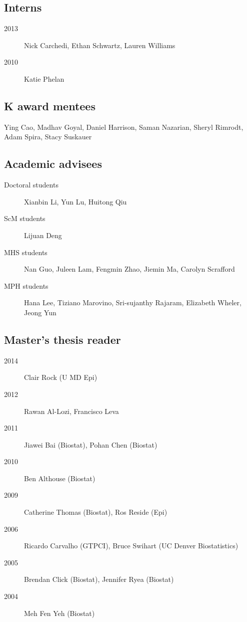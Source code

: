 \documentclass[12pt]{article}
\begin{document}

\subsection*{Interns}
\begin{description}
\item[\textnormal{2013}] Nick Carchedi, Ethan Schwartz, Lauren Williams
\item[\textnormal{2010}] Katie Phelan
\end{description}

\subsection*{K award mentees}
Ying Cao, Madhav Goyal, Daniel Harrison, Saman Nazarian, Sheryl Rimrodt, Adam Spira, Stacy Suskauer

\subsection*{Academic advisees}
\begin{description}
\item[\textnormal{Doctoral students}] Xianbin Li, Yun Lu, Huitong Qiu 
\item[\textnormal{ScM students}]  Lijuan Deng  
\item[\textnormal{MHS students}]  Nan Guo, Juleen Lam, Fengmin Zhao, Jiemin Ma, Carolyn Scrafford
\item[\textnormal{MPH students}]  Hana Lee, Tiziano Marovino, Sri-sujanthy Rajaram, Elizabeth Wheler, Jeong Yun 
\end{description}

\subsection*{Master's thesis reader} 
\begin{description}
\item[\textnormal{2014}] Clair Rock (U MD Epi)
\item[\textnormal{2012}] Rawan Al-Lozi, Francisco Leva
\item[\textnormal{2011}] Jiawei Bai (Biostat), Pohan Chen (Biostat)
\item[\textnormal{2010}] Ben Althouse (Biostat) 
\item[\textnormal{2009}] Catherine Thomas (Biostat), Ros Reside (Epi) 
\item[\textnormal{2006}] Ricardo Carvalho (GTPCI), Bruce Swihart (UC Denver Biostatistics) 
\item[\textnormal{2005}] Brendan Click (Biostat), Jennifer Ryea (Biostat) 
\item[\textnormal{2004}] Meh Fen Yeh (Biostat) 
\end{description}
\end{document}
